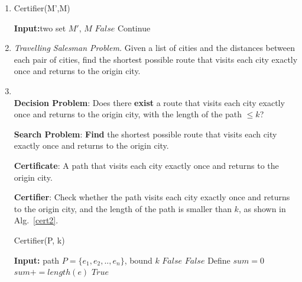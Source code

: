 \documentclass[12pt,a4paper]{article}
\makeatletter
\newtheorem*{solution}{Solution}
\theoremstyle{definition}
\renewenvironment{solution}[1][Solution] {\par\pushQED{\qed}\normalfont\topsep6\p@\@plus6\p@\relax\trivlist\item[\hskip\labelsep\bfseries#1\@addpunct{.}]\ignorespaces}{\popQED\endtrivlist\@endpefalse} \makeatother
\makeatother
\begin{document}
\begin{enumerate}
\begin{enumerate}
\begin{solution}
	    \begin{center}
	    \begin{algorithm}[H]
	    \caption{Certifier(M',M)}
	    \label{cert1}
	    \textbf{Input:}two set $M'$, $M$\;
	    {
	    \Return $False$\;
	    }
        {
        {
        {
        {
        Continue\;}
        }
        }
        }	    
	    \end{algorithm}
	    \end{center}
	    
	    \end{solution}
	    \item 
	    \textit{Travelling Salesman Problem.} Given a list of cities and the distances between each pair of cities, find the shortest possible route that visits each city exactly once and returns to the origin city.
	    \begin{solution}
	    ~\\
	    \textbf{Decision Problem}: Does there \textbf{exist} a route that
visits each city exactly once and returns to the origin city, with the length of the path  $\leqslant k$?

	    \textbf{Search Problem}: \textbf{Find} the shortest possible route that visits each city exactly once and returns to the origin city.
	    
	    \textbf{Certificate}: A path that visits each city exactly once and returns to the origin city.
	    
	    \textbf{Certifier}: Check whether the path visits each city exactly once and returns to the origin city, and the length of the path is smaller than $k$, as shown in Alg.~\ref{cert2}.
	    
	    \begin{center}
	        \begin{algorithm}[H]
	        \caption{Certifier(P, k)}
	        \textbf{Input:} path $P=\{e_1,e_2,..,e_n\}$, bound $k$\;
	        {\Return $False$\;
	        }
	        {\Return $False$\;
	        }
	        Define $sum=0$\;
	        {$sum += length(e)$\;
	        }
	        {
	        \Return $True$\;
	        }
	        

\end{algorithm}
\end{center}
\end{solution}
\end{enumerate}
\end{enumerate}
\end{document}
